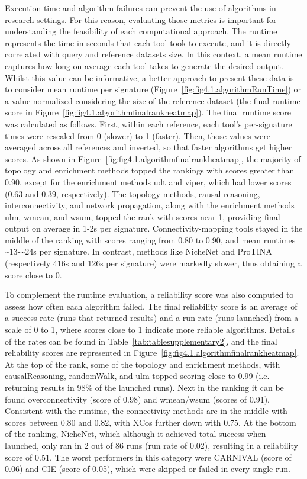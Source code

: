 Execution time and algorithm failures can prevent the use of algorithms in research settings.
For this reason, evaluating those metrics is important for understanding the feasibility of each computational approach.
The runtime represents the time in seconds that each tool took to execute, and it is directly correlated with query and reference datasets size.
In this context, a mean runtime captures how long on average each tool takes to generate the desired output.
Whilst this value can be informative, a better approach to present these data is to consider mean runtime per signature (Figure~\ref{fig:fig4.1.algorithmRunTime}) or a value normalized considering the size of the reference dataset (the final runtime score in Figure~\ref{fig:fig4.1.algorithmfinalrankheatmap}).
The final runtime score was calculated as follows. First, within each reference, each tool's per-signature times were rescaled from 0 (slower) to 1 (faster).
Then, those values were averaged across all references and inverted, so that faster algorithms get higher scores. As shown in Figure~\ref{fig:fig4.1.algorithmfinalrankheatmap}, the majority of topology and enrichment methods topped the rankings with scores greater than 0.90, except for the enrichment methods udt and viper, which had lower scores (0.63 and 0.39, respectively).
The topology methods, causal reasoning, interconnectivity, and network propagation, along with the enrichment methods ulm, wmean, and wsum, topped the rank with scores near 1, providing final output on average in 1-2s per signature.
Connectivity-mapping tools stayed in the middle of the ranking with scores ranging from 0.80 to 0.90, and mean runtimes \textasciitilde13-\textasciitilde24s per signature.
In contrast, methods like NicheNet and \gls{ProTINA} (respectively 416s and 126s per signature) were markedly slower, thus obtaining a score close to 0.

To complement the runtime evaluation, a reliability score was also computed to assess how often each algorithm failed.
The final reliability score is an average of a success rate (runs that returned results) and a run rate (runs launched) from a scale of 0 to 1, where scores close to 1 indicate more reliable algorithms.
Details of the rates can be found in Table~\ref{tab:tablesupplementary2}, and the final reliability scores are represented in Figure~\ref{fig:fig4.1.algorithmfinalrankheatmap}.
At the top of the rank, some of the topology and enrichment methods, with causalReasoning, randomWalk, and ulm topped scoring close to 0.99 (i.e. returning results in 98\% of the launched runs).
Next in the ranking it can be found overconnectivity (score of 0.98) and wmean/wsum (scores of 0.91).
Consistent with the runtime, the connectivity methods are in the middle with scores between 0.80 and 0.82, with XCos further down with 0.75.
At the bottom of the ranking, NicheNet, which although it achieved total success when launched, only ran in 2 out of 86 runs (run rate of 0.02), resulting in a reliability score of 0.51.
The worst performers in this category were \gls{CARNIVAL} (score of 0.06) and \gls{CIE} (score of 0.05), which were skipped or failed in every single run. 

